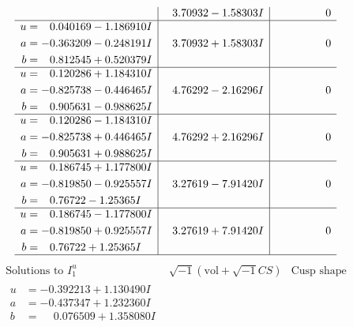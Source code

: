 \documentclass[1p]{elsarticle_modified}
\theoremstyle{definition}
\newcommand{\I}{\sqrt{-1}}
\begin{document}
$$\begin{array}{c|c|c}
 & \phantom{-}3.70932 - 1.58303 I & \phantom{-0.000000 } 0 \\ \hline\begin{aligned}
u &= \phantom{-}0.040169 - 1.186910 I \\
a &= -0.363209 - 0.248191 I \\
b &= \phantom{-}0.812545 + 0.520379 I\end{aligned}
 & \phantom{-}3.70932 + 1.58303 I & \phantom{-0.000000 } 0 \\ \hline\begin{aligned}
u &= \phantom{-}0.120286 + 1.184310 I \\
a &= -0.825738 - 0.446465 I \\
b &= \phantom{-}0.905631 - 0.988625 I\end{aligned}
 & \phantom{-}4.76292 - 2.16296 I & \phantom{-0.000000 } 0 \\ \hline\begin{aligned}
u &= \phantom{-}0.120286 - 1.184310 I \\
a &= -0.825738 + 0.446465 I \\
b &= \phantom{-}0.905631 + 0.988625 I\end{aligned}
 & \phantom{-}4.76292 + 2.16296 I & \phantom{-0.000000 } 0 \\ \hline\begin{aligned}
u &= \phantom{-}0.186745 + 1.177800 I \\
a &= -0.819850 - 0.925557 I \\
b &= \phantom{-}0.76722 - 1.25365 I\end{aligned}
 & \phantom{-}3.27619 - 7.91420 I & \phantom{-0.000000 } 0 \\ \hline\begin{aligned}
u &= \phantom{-}0.186745 - 1.177800 I \\
a &= -0.819850 + 0.925557 I \\
b &= \phantom{-}0.76722 + 1.25365 I\end{aligned}
 & \phantom{-}3.27619 + 7.91420 I & \phantom{-0.000000 } 0\\
 \hline 
 \end{array}$$\newpage$$\begin{array}{c|c|c}  
\text{Solutions to }I^u_{1}& \I (\text{vol} + \sqrt{-1}CS) & \text{Cusp shape}\\
 \hline 
\begin{aligned}
u &= -0.392213 + 1.130490 I \\
a &= -0.437347 + 1.232360 I \\
b &= \phantom{-}0.076509 + 1.358080 I\end{aligned}

\end{array}$$
\end{document}
